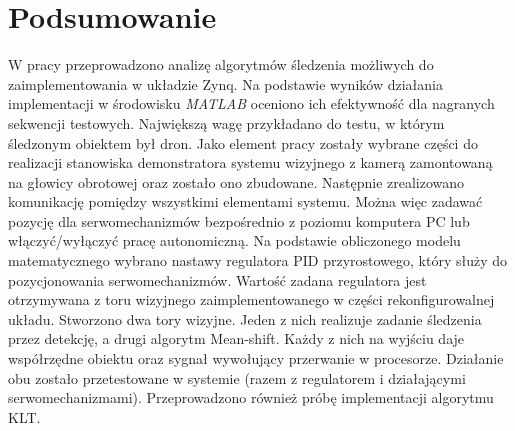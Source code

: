 \chapter{Podsumowanie}
\label{cha:podsumowanie}

W pracy przeprowadzono analizę algorytmów śledzenia możliwych do zaimplementowania w układzie Zynq. 
Na podstawie wyników działania implementacji w środowisku \textit{MATLAB} oceniono ich efektywność dla nagranych sekwencji testowych. 
Największą wagę przykładano do testu, w którym śledzonym obiektem był dron. 
Jako element pracy zostały wybrane części do realizacji stanowiska demonstratora systemu wizyjnego z kamerą zamontowaną na głowicy obrotowej oraz zostało ono zbudowane. 
Następnie zrealizowano komunikację pomiędzy wszystkimi elementami systemu. 
Można więc zadawać pozycję dla serwomechanizmów bezpośrednio z poziomu komputera PC lub włączyć/wyłączyć pracę autonomiczną.
Na podstawie obliczonego modelu matematycznego wybrano nastawy regulatora PID przyrostowego, który służy do pozycjonowania serwomechanizmów. 
Wartość zadana regulatora jest otrzymywana z toru wizyjnego zaimplementowanego w części rekonfigurowalnej układu. 
Stworzono dwa tory wizyjne. 
Jeden z nich realizuje zadanie śledzenia przez detekcję, a drugi algorytm Mean-shift. 
Każdy z nich na wyjściu daje współrzędne obiektu oraz sygnał wywołujący przerwanie w procesorze. 
Działanie obu zostało przetestowane w systemie (razem z regulatorem i działającymi serwomechanizmami). 
Przeprowadzono również próbę implementacji algorytmu KLT.


